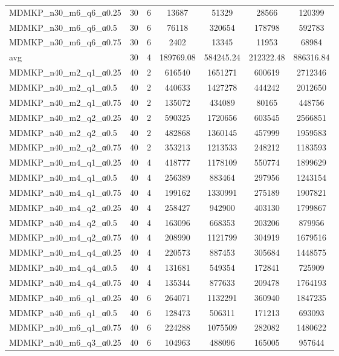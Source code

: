 \begin{table}[!ht]
\begin{tabular}{lcccccc}
MDMKP\_n30\_m6\_q6\_α0.25 & 30 & 6 & 13687 & 51329 & 28566 & 120399 \\
MDMKP\_n30\_m6\_q6\_α0.5 & 30 & 6 & 76118 & 320654 & 178798 & 592783 \\
MDMKP\_n30\_m6\_q6\_α0.75 & 30 & 6 & 2402 & 13345 & 11953 & 68984 \\
\cline{1-9} avg & 30 & 4 & 189769.08& 584245.24 & 212322.48& 886316.84\\ \hline
MDMKP\_n40\_m2\_q1\_α0.25 & 40 & 2 & 616540 & 1651271 & 600619 & 2712346 \\
MDMKP\_n40\_m2\_q1\_α0.5 & 40 & 2 & 440633 & 1427278 & 444242 & 2012650 \\
MDMKP\_n40\_m2\_q1\_α0.75 & 40 & 2 & 135072 & 434089 & 80165 & 448756 \\
MDMKP\_n40\_m2\_q2\_α0.25 & 40 & 2 & 590325 & 1720656 & 603545 & 2566851 \\
MDMKP\_n40\_m2\_q2\_α0.5 & 40 & 2 & 482868 & 1360145 & 457999 & 1959583 \\
MDMKP\_n40\_m2\_q2\_α0.75 & 40 & 2 & 353213 & 1213533 & 248212 & 1183593 \\
MDMKP\_n40\_m4\_q1\_α0.25 & 40 & 4 & 418777 & 1178109 & 550774 & 1899629 \\
MDMKP\_n40\_m4\_q1\_α0.5 & 40 & 4 & 256389 & 883464 & 297956 & 1243154 \\
MDMKP\_n40\_m4\_q1\_α0.75 & 40 & 4 & 199162 & 1330991 & 275189 & 1907821 \\
MDMKP\_n40\_m4\_q2\_α0.25 & 40 & 4 & 258427 & 942900 & 403130 & 1799867 \\
MDMKP\_n40\_m4\_q2\_α0.5 & 40 & 4 & 163096 & 668353 & 203206 & 879956 \\
MDMKP\_n40\_m4\_q2\_α0.75 & 40 & 4 & 208990 & 1121799 & 304919 & 1679516 \\
MDMKP\_n40\_m4\_q4\_α0.25 & 40 & 4 & 220573 & 887453 & 305684 & 1448575 \\
MDMKP\_n40\_m4\_q4\_α0.5 & 40 & 4 & 131681 & 549354 & 172841 & 725909 \\
MDMKP\_n40\_m4\_q4\_α0.75 & 40 & 4 & 135344 & 877633 & 209478 & 1764193 \\
MDMKP\_n40\_m6\_q1\_α0.25 & 40 & 6 & 264071 & 1132291 & 360940 & 1847235 \\
MDMKP\_n40\_m6\_q1\_α0.5 & 40 & 6 & 128473 & 506311 & 171213 & 693093 \\
MDMKP\_n40\_m6\_q1\_α0.75 & 40 & 6 & 224288 & 1075509 & 282082 & 1480622 \\
MDMKP\_n40\_m6\_q3\_α0.25 & 40 & 6 & 104963 & 488096 & 165005 & 957644 \\

\end{tabular}
\end{table}
